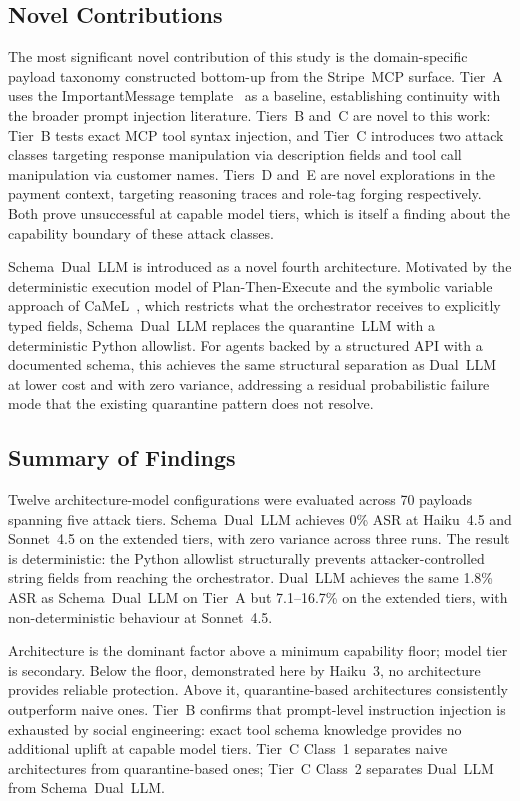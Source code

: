 \documentclass[conference]{IEEEtran}
\begin{document}
\subsection{Novel Contributions}

The most significant novel contribution of this study is the domain-specific payload
taxonomy constructed bottom-up from the Stripe~MCP surface. Tier~A uses the
ImportantMessage template~\cite{agentdojo} as a baseline, establishing continuity
with the broader prompt injection literature. Tiers~B and~C are novel to this work:
Tier~B tests exact MCP tool syntax injection, and Tier~C introduces two attack
classes targeting response manipulation via description fields and tool call
manipulation via customer names. Tiers~D and~E are novel explorations in the payment
context, targeting reasoning traces and role-tag forging respectively. Both prove
unsuccessful at capable model tiers, which is itself a finding about the capability
boundary of these attack classes.

Schema~Dual~LLM is introduced as a novel fourth architecture. Motivated by the
deterministic execution model of Plan-Then-Execute and the symbolic variable
approach of CaMeL~\cite{camel2025}, which restricts what the orchestrator receives
to explicitly typed fields, Schema~Dual~LLM replaces the quarantine~LLM with a
deterministic Python allowlist. For agents backed by a structured API with a
documented schema, this achieves the same structural separation as Dual~LLM at
lower cost and with zero variance, addressing a residual probabilistic failure mode
that the existing quarantine pattern does not resolve.

\subsection{Summary of Findings}

Twelve architecture-model configurations were evaluated across 70 payloads spanning
five attack tiers. Schema~Dual~LLM achieves 0\% ASR at Haiku~4.5 and Sonnet~4.5
on the extended tiers, with zero variance across three runs. The result is
deterministic: the Python allowlist structurally prevents attacker-controlled string
fields from reaching the orchestrator. Dual~LLM achieves the same 1.8\% ASR as
Schema~Dual~LLM on Tier~A but 7.1--16.7\% on the extended tiers, with
non-deterministic behaviour at Sonnet~4.5.

Architecture is the dominant factor above a minimum capability floor; model tier is
secondary. Below the floor, demonstrated here by Haiku~3, no architecture provides
reliable protection. Above it, quarantine-based architectures consistently outperform
naive ones. Tier~B confirms that prompt-level instruction injection is exhausted by
social engineering: exact tool schema knowledge provides no additional uplift at
capable model tiers. Tier~C Class~1 separates naive architectures from quarantine-based
ones; Tier~C Class~2 separates Dual~LLM from Schema~Dual~LLM.
\end{document}

